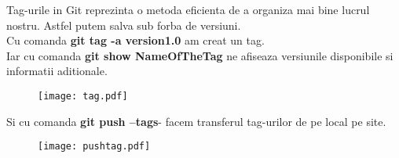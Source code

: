 \tab Tag-urile in Git reprezinta o metoda eficienta de a organiza mai bine lucrul nostru. Astfel putem salva sub forba de versiuni.\\
Cu comanda \textbf{git tag -a version1.0 } am creat un tag.\\
Iar cu comanda \textbf{git show NameOfTheTag} ne afiseaza versiunile disponibile si informatii aditionale.
\begin{figure}[h]
\centering
\texttt{[image: tag.pdf]}
\end{figure}

\tab Si cu comanda \textbf{git push --tags}- facem transferul tag-urilor de pe local pe site.
\begin{figure}[h]
\centering
\texttt{[image: pushtag.pdf]}
\end{figure}